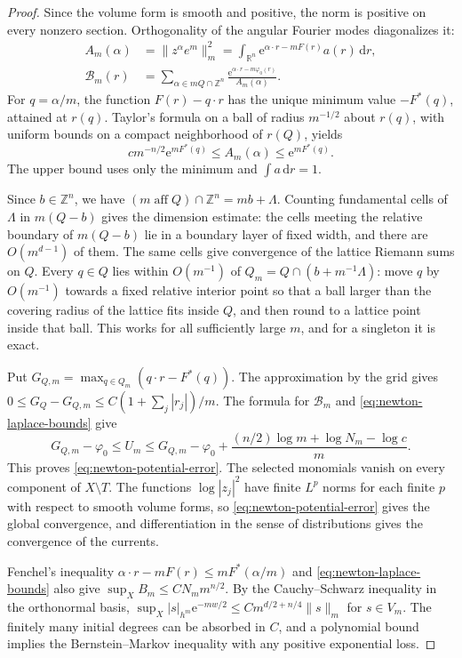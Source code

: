 \begin{proof}
Since the volume form is smooth and positive, the norm is positive on every nonzero
section. Orthogonality of the angular Fourier modes diagonalizes it:
\begin{align*}
 A_m(\alpha)&=\|z^\alpha e^m\|_m^2
   =\int_{\mathbb R^n}\mathrm e^{\alpha\cdot r-mF(r)}a(r)\,\mathrm dr,\\
 \mathcal B_m(r)&=\sum_{\alpha\in mQ\cap\mathbb Z^n}
       \frac{\mathrm e^{\alpha\cdot r-m\varphi_0(r)}}{A_m(\alpha)}.
\end{align*}
For $q=\alpha/m$, the function $F(r)-q\cdot r$ has the unique minimum value
$-F^*(q)$, attained at $r(q)$. Taylor's formula on a ball of radius $m^{-1/2}$ about $r(q)$,
with uniform bounds on a compact neighborhood of $r(Q)$, yields
\begin{equation}\label{eq:newton-laplace-bounds}
 c m^{-n/2}\mathrm e^{mF^*(q)}\leq A_m(\alpha)
                         \leq\mathrm e^{mF^*(q)}.
\end{equation}
The upper bound uses only the minimum and $\int a\,\mathrm dr=1$.

Since $b\in\mathbb Z^n$, we have
$(m\operatorname{aff}Q)\cap\mathbb Z^n=mb+\Lambda$.
Counting fundamental cells of $\Lambda$ in $m(Q-b)$ gives the dimension estimate: the cells meeting the relative boundary of $m(Q-b)$ lie in a boundary layer of fixed width, and there are $O(m^{d-1})$ of them. The same cells give convergence of the lattice Riemann sums on $Q$.
Every $q\in Q$ lies within $O(m^{-1})$ of
$Q_m=Q\cap(b+m^{-1}\Lambda)$: move $q$ by $O(m^{-1})$ towards a fixed relative
interior point so that a ball larger than the covering radius of the lattice fits inside $Q$, and then round to a lattice point inside that ball. This works for all
sufficiently large $m$, and for a singleton it is exact.

Put $G_{Q,m}=\max_{q\in Q_m}(q\cdot r-F^*(q))$. The approximation by the grid
gives $0\leq G_Q-G_{Q,m}\leq C(1+\sum_j|r_j|)/m$.
The formula for $\mathcal B_m$ and \eqref{eq:newton-laplace-bounds} give
\[
 G_{Q,m}-\varphi_0\leq U_m\leq G_{Q,m}-\varphi_0+
     \frac{(n/2)\log m+\log N_m-\log c}{m}.
\]
This proves \eqref{eq:newton-potential-error}. The selected monomials vanish
on every component of $X\setminus T$. The functions $\log|z_j|^2$ have finite
$L^p$ norms for each finite $p$ with respect to smooth volume forms, so \eqref{eq:newton-potential-error} gives the global
convergence, and differentiation in the sense of distributions gives the convergence of the currents.

Fenchel's inequality $\alpha\cdot r-mF(r)\leq mF^*(\alpha/m)$ and \eqref{eq:newton-laplace-bounds} also give
$\sup_X B_m\leq C N_m m^{n/2}$. By the Cauchy--Schwarz inequality in the orthonormal
basis,
$\sup_X|s|_{h^m}\mathrm e^{-mw/2}
\leq C m^{d/2+n/4}\|s\|_m$ for $s\in V_m$.
The finitely many initial degrees can be absorbed in $C$, and a polynomial bound
implies the Bernstein--Markov inequality with any positive exponential loss.
\end{proof}

